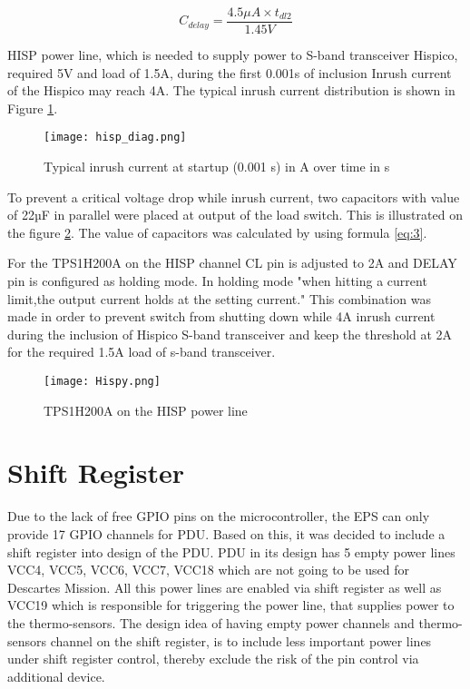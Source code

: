 \begin{equation} \label{eq: t2}
C_{delay} = \frac{4.5\mu A \times t_{dl2}}{1.45V} 
\end{equation}



 HISP power line, which is needed to supply power to S-band transceiver Hispico, required 5V and load of 1.5A, during the first 0.001s of inclusion Inrush current of the Hispico may reach 4A. The typical inrush current distribution is shown in Figure \ref{fig: hisp_inr}.

\begin{figure}[h]
	\centering
	\texttt{[image: hisp\_diag.png]}
	\caption{Typical inrush current at startup (0.001 s) in A over time in s}
	\label{fig: hisp_inr}
\end{figure} 

To prevent a critical voltage drop while inrush current, two capacitors with value of 22µF in parallel were placed at output of the load switch. This is illustrated on the figure \ref{fig: hispico}. The value of capacitors was calculated by using formula \ref{eq:3}.

For the TPS1H200A on the HISP channel CL pin is adjusted to 2A and DELAY pin is configured as holding mode. In holding mode \cite{28}"when hitting a current limit,the output current holds at the setting current." This combination was made in order to prevent switch from shutting down while 4A inrush current during the inclusion of Hispico S-band transceiver and keep the threshold at 2A for the required 1.5A load of s-band transceiver. 
 


\begin{figure}[h]
	\centering
	\texttt{[image: Hispy.png]}
	\caption{TPS1H200A on the HISP power line}
	\label{fig: hispico}
\end{figure}



 
\section{Shift Register}\label{shiftty}

Due to the lack of free GPIO pins on the microcontroller, the EPS can only provide 17 GPIO channels for PDU. Based on this, it was decided to include a shift register into design of the PDU. PDU in its design has 5 empty power lines VCC4, VCC5, VCC6, VCC7, VCC18 which are not going to be used for Descartes Mission. All this power lines are enabled via shift register as well as VCC19 which is responsible for triggering the power line, that supplies power to the thermo-sensors. The design idea of having empty power channels and thermo-sensors channel on the shift register, is to include less important power lines under shift register control, thereby exclude the risk of the pin control via additional device. 


